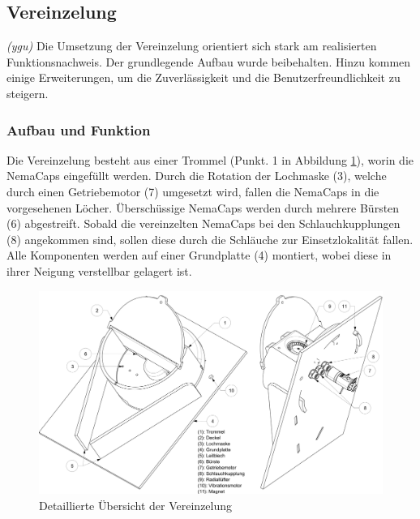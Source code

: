 \subsection{Vereinzelung} 
\label{sec:Vereinzelung}
\textit{(ygu)} Die Umsetzung der Vereinzelung orientiert sich stark am realisierten Funktionsnachweis. Der grundlegende Aufbau wurde beibehalten. Hinzu kommen einige Erweiterungen, um die Zuverlässigkeit und die Benutzerfreundlichkeit zu steigern.

\subsubsection{Aufbau und Funktion}
Die Vereinzelung besteht aus einer Trommel (Punkt. 1 in Abbildung \ref{fig:details_vereinzelung}), worin die NemaCaps eingefüllt werden. Durch die Rotation der Lochmaske (3), welche durch einen Getriebemotor (7) umgesetzt wird, fallen die NemaCaps in die vorgesehenen Löcher. Überschüssige NemaCaps werden durch mehrere Bürsten (6) abgestreift. Sobald die vereinzelten NemaCaps bei den Schlauchkupplungen (8) angekommen sind, sollen diese durch die Schläuche zur Einsetzlokalität fallen. Alle Komponenten werden auf einer Grundplatte (4) montiert, wobei diese in ihrer Neigung verstellbar gelagert ist.
	\begin{figure}[H]
	\includegraphics[scale=0.455]{Illustrationen/6-Umsetzung/details_vereinzelung.jpg}
	\caption{Detaillierte Übersicht der Vereinzelung}
	\label{fig:details_vereinzelung}
	\end{figure}

